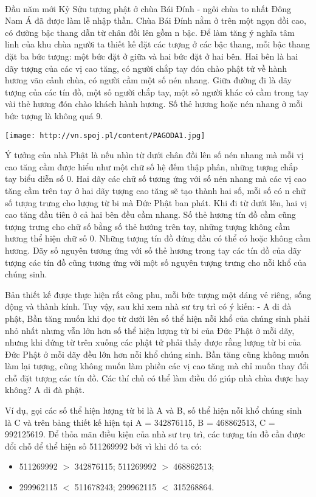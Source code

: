 

 

Đầu năm mới Kỷ Sửu tượng phật ở chùa Bái Đính - ngôi chùa to nhất Đông Nam Á đã được làm lễ nhập thần. Chùa Bái Đính nằm ở trên một ngọn đồi cao, có đường bậc thang dẫn từ chân đồi lên gồm n bậc. Để làm tăng ý nghĩa tâm linh của khu chùa người ta thiết kế đặt các tượng ở các bậc thang, mỗi bậc thang đặt ba bức tượng: một bức đặt ở giữa và hai bức đặt ở hai bên. Hai bên là hai dãy tượng của các vị cao tăng, có người chắp tay đón chào phật tử về hành hương vãn cảnh chùa, có người cầm một số nén nhang. Giữa đường đi là dãy tượng của các tín đồ, một số người chắp tay, một số người khác có cầm trong tay vài thẻ hương đón chào khách hành hương. Số thẻ hương hoặc nén nhang ở mỗi bức tượng là không quá 9.


\texttt{[image: http://vn.spoj.pl/content/PAGODA1.jpg]}

Ý tưởng của nhà Phật là nếu nhìn từ dưới chân đồi lên số nén nhang mà mỗi vị cao tăng cầm được hiểu như một chữ số hệ đếm thập phân, những tượng chắp tay biểu diễn số 0. Hai dãy các chữ số tương ứng với số nén nhang mà các vị cao tăng cầm trên tay ở hai dãy tượng cao tăng sẽ tạo thành hai số, mỗi số có n chữ số tượng trưng cho lượng từ bi mà Đức Phật ban phát. Khi đi từ dưới lên, hai vị cao tăng đầu tiên ở cả hai bên đều cầm nhang. Số thẻ hương tín đồ cầm cũng tượng trưng cho chữ số bằng số thẻ hướng trên tay, những tượng không cầm hương thể hiện chữ số 0. Những tượng tín đồ đứng đầu có thể có hoặc không cầm hương. Dãy số nguyên tương ứng với số thẻ hương trong tay các tín đồ của dãy tượng các tín đồ cũng tương ứng với một số nguyên tượng trưng cho nỗi khổ của chúng sinh.





Bản thiết kế được thực hiện rất công phu, mỗi bức tượng một dáng vẻ riêng, sống động và thành kính. Tuy vậy, sau khi xem nhà sư trụ trì có ý kiến: - A di đà phật, Bần tăng muốn khi đọc từ dưới lên số thể hiện nỗi khổ của chúng sinh phải nhỏ nhất nhưng vẫn lớn hơn số thể hiện lượng từ bi của Đức Phật ở mỗi dãy, nhưng khi đứng từ trên xuống các phật tử phải thấy được rằng lượng từ bi của Đức Phật ở mỗi dãy đều lớn hơn nỗi khổ chúng sinh. Bần tăng cũng không muốn làm lại tượng, cũng không muốn làm phiền các vị cao tăng mà chỉ muốn thay đổi chỗ đặt tượng các tín đồ. Các thí chủ có thể làm điều đó giúp nhà chùa được hay không? A di đà phật.


Ví dụ, gọi các số thể hiện lượng từ bi là A và B, số thể hiện nỗi khổ chúng sinh là C và trên bảng thiết kế hiện tại A = 342876115, B = 468862513, C = 992125619. Để thỏa mãn điều kiện của nhà sư trụ trì, các tượng tín đồ cần được đổi chỗ để thể hiện số 511269992 bởi vì khi đó ta có:
\begin{itemize}
	\item 511269992 $>$ 342876115; 511269992 $>$ 468862513;
	\item 299962115 $<$ 511678243; 299962115 $<$ 315268864.
\end{itemize}


